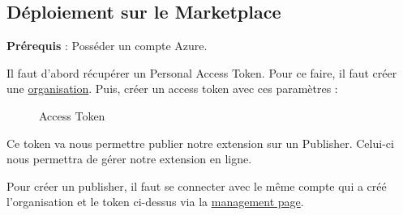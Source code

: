 \documentclass[
    iict, %
    il, %
]{heig-tb}
\begin{document}
\subsection{Déploiement sur le Marketplace}


\textbf{Prérequis} : Posséder un compte Azure.


Il faut d'abord récupérer un Personal Access Token. Pour ce faire, il faut créer une \href{https://docs.microsoft.com/en-us/azure/devops/organizations/accounts/create-organization?view=azure-devops}{organisation}.
Puis, créer un access token avec ces paramètres :
\begin{figure}[!h]
    \begin{center}
    \end{center}
    \caption[Access Token]{\label{access-token}Access Token}
\end{figure}

Ce token va nous permettre publier notre extension sur un Publisher. Celui-ci nous permettra de gérer notre extension en ligne.

Pour créer un publisher, il faut se connecter avec le même compte qui a créé l'organisation et le token ci-dessus via la \href{https://marketplace.visualstudio.com/manage/publishers/}{management page}.
\end{document}

